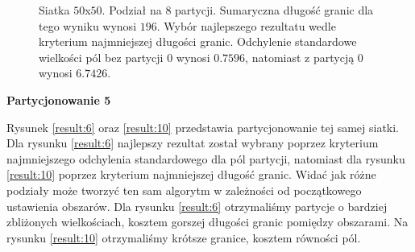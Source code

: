 \begin{figure}[h]
\begin{subfigure}{.33\textwidth}
    \caption[short]{}
\end{subfigure}
\caption{Siatka $50$x$50$. Podział na $8$ partycji. Sumaryczna długość granic dla tego wyniku wynosi $196$.
Wybór najlepszego rezultatu wedle kryterium najmniejszej długości granic.
Odchylenie standardowe wielkości pól bez partycji $0$ wynosi $0.7596$, natomiast z partycją $0$ wynosi $6.7426$.}
\label{result:5}
\end{figure}

\newpage
\vspace{3mm}
\textbf{Partycjonowanie 5}
\vspace{1mm}

Rysunek \ref{result:6} oraz \ref{result:10} przedstawia partycjonowanie tej samej siatki.
Dla rysunku \ref{result:6} najlepszy rezultat został wybrany poprzez kryterium najmniejszego odchylenia standardowego
dla pól partycji, natomiast dla rysunku \ref{result:10} poprzez kryterium najmniejszej długość granic.
Widać jak różne podziały może tworzyć ten sam algorytm w zależności od początkowego ustawienia obszarów.
Dla rysunku \ref{result:6} otrzymaliśmy partycje o bardziej zbliżonych wielkościach, kosztem gorszej długości granic pomiędzy obszarami.
Na rysunku \ref{result:10} otrzymaliśmy krótsze granice, kosztem równości pól.
